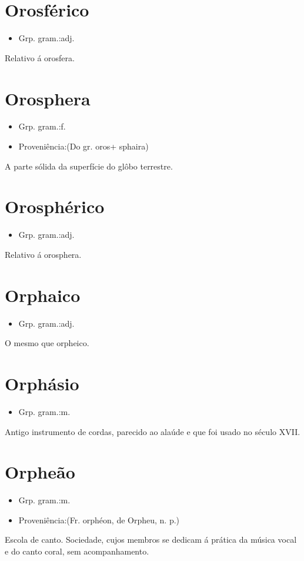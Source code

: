 \section{Orosférico}
\begin{itemize}
\item {Grp. gram.:adj.}
\end{itemize}
Relativo á orosfera.
\section{Orosphera}
\begin{itemize}
\item {Grp. gram.:f.}
\end{itemize}
\begin{itemize}
\item {Proveniência:(Do gr. \textunderscore oros\textunderscore  + \textunderscore sphaira\textunderscore )}
\end{itemize}
A parte sólida da superfície do glôbo terrestre.
\section{Orosphérico}
\begin{itemize}
\item {Grp. gram.:adj.}
\end{itemize}
Relativo á orosphera.
\section{Orphaico}
\begin{itemize}
\item {Grp. gram.:adj.}
\end{itemize}
O mesmo que \textunderscore orpheico\textunderscore .
\section{Orphásio}
\begin{itemize}
\item {Grp. gram.:m.}
\end{itemize}
Antigo instrumento de cordas, parecido ao alaúde e que foi usado no século XVII.
\section{Orpheão}
\begin{itemize}
\item {Grp. gram.:m.}
\end{itemize}
\begin{itemize}
\item {Proveniência:(Fr. \textunderscore orphéon\textunderscore , de \textunderscore Orpheu\textunderscore , n. p.)}
\end{itemize}
Escola de canto.
Sociedade, cujos membros se dedicam á prática da música vocal e do canto coral, sem acompanhamento.
